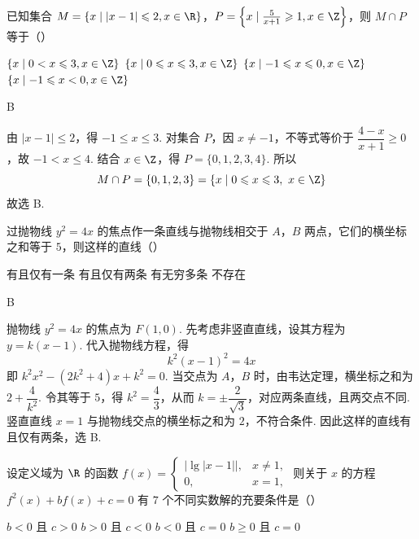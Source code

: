 \begin{problem}
已知集合 \(M = \{x \mid |x - 1| \leqslant 2, x \in \R\}\)，\(P = \left\{x \mid \frac{5}{x + 1} \geqslant 1, x \in \Z\right\}\)，则 \(M \cap P\) 等于（\quad）

\choices
    {\(\{x\mid 0 < x\leqslant 3,x\in \Z\}\)}
    {\(\{x\mid 0\leqslant x\leqslant 3,x\in \Z\}\)}
    {\(\{x\mid -1\leqslant x\leqslant 0,x\in \Z\}\)}
    {\(\{x\mid -1\leqslant x < 0,x\in \Z\}\)}
\end{problem}

\begin{answer}
B
\end{answer}

\begin{solution}
由 \(\lvert x-1\rvert\leqslant2\)，得 \(-1\leqslant x\leqslant3\). 对集合 \(P\)，因 \(x\neq-1\)，不等式等价于 \(\dfrac{4-x}{x+1}\geqslant0\)，故 \(-1<x\leqslant4\). 结合 \(x\in\Z\)，得 \(P=\{0,1,2,3,4\}\). 所以
\[
M\cap P=\{0,1,2,3\}=\{x\mid0\leqslant x\leqslant3,\ x\in\Z\}
\]
故选 B.
\end{solution}

\begin{problem}
过抛物线 \( y^{2}=4x \) 的焦点作一条直线与抛物线相交于 \(A\)，\(B\) 两点，它们的横坐标之和等于 \(5\)，则这样的直线（\quad）

\choices
    {有且仅有一条}
    {有且仅有两条}
    {有无穷多条}
    {不存在}
\end{problem}

\begin{answer}
B
\end{answer}

\begin{solution}
抛物线 \(y^2=4x\) 的焦点为 \(F(1,0)\). 先考虑非竖直直线，设其方程为 \(y=k(x-1)\). 代入抛物线方程，得
\[
k^2(x-1)^2=4x
\]
即 \(k^2x^2-(2k^2+4)x+k^2=0\). 当交点为 \(A\)，\(B\) 时，由韦达定理，横坐标之和为 \(2+\dfrac4{k^2}\). 令其等于 \(5\)，得 \(k^2=\dfrac43\)，从而 \(k=\pm\dfrac2{\sqrt3}\)，对应两条直线，且两交点不同. 竖直直线 \(x=1\) 与抛物线交点的横坐标之和为 \(2\)，不符合条件. 因此这样的直线有且仅有两条，选 B.
\end{solution}

\begin{problem}
设定义域为 \(\R\) 的函数 \(f(x) = \begin{cases}
|\lg |x - 1||, & x \neq 1,\\
0, & x = 1,
\end{cases}\) 则关于 \(x\) 的方程 \(f^2(x) + bf(x) + c = 0\) 有 \(7\) 个不同实数解的充要条件是（\quad）

\choices
    {\(b < 0\) 且 \(c > 0\)}
    {\(b > 0\) 且 \(c < 0\)}
    {\(b < 0\) 且 \(c = 0\)}
    {\(b \geqslant 0\) 且 \(c = 0\)}
\end{problem}

